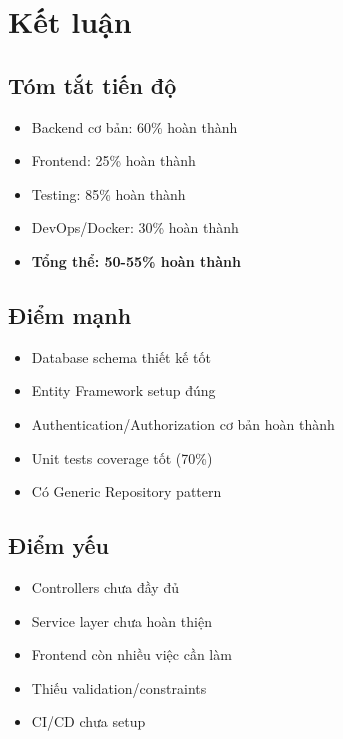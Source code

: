 \documentclass[12pt,a4paper]{report}
\begin{document}
\newpage

\chapter{Kết luận}

\section{Tóm tắt tiến độ}
\begin{itemize}
    \item Backend cơ bản: 60\% hoàn thành
    \item Frontend: 25\% hoàn thành
    \item Testing: 85\% hoàn thành
    \item DevOps/Docker: 30\% hoàn thành
    \item \textbf{Tổng thể: 50-55\% hoàn thành}
\end{itemize}

\section{Điểm mạnh}
\begin{itemize}
    \item[$+$] Database schema thiết kế tốt
    \item[$+$] Entity Framework setup đúng
    \item[$+$] Authentication/Authorization cơ bản hoàn thành
    \item[$+$] Unit tests coverage tốt (70\%)
    \item[$+$] Có Generic Repository pattern
\end{itemize}

\section{Điểm yếu}
\begin{itemize}
    \item[$-$] Controllers chưa đầy đủ
    \item[$-$] Service layer chưa hoàn thiện
    \item[$-$] Frontend còn nhiều việc cần làm
    \item[$-$] Thiếu validation/constraints
    \item[$-$] CI/CD chưa setup
\end{itemize}
\end{document}
